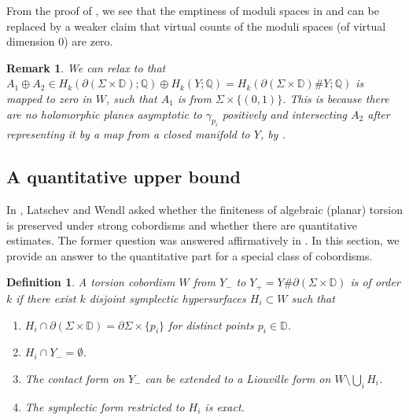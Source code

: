 \documentclass[11pt]{amsart}
\numberwithin{equation}{section}
\newtheorem{definition}[theorem]{\textbf{Definition}}
\newtheorem{remark}[theorem]{\textbf{Remark}}
\def\D{{\mathbb D}}
\def\Q{{\mathbb Q}}
\begin{document}
From the proof of , we see that the emptiness of moduli spaces in  and  can be replaced by a weaker claim that virtual counts of the moduli spaces (of virtual dimension $0$) are zero. 

\begin{remark}
    We can relax  to that $A_1\oplus A_2\in  H_k(\partial(\Sigma \times \D);\Q)\oplus H_k(Y;\Q) = H_k(\partial(\Sigma\times \D)\# Y;\Q)$ is mapped to zero in $W$, such that $A_1$ is from $\Sigma \times \{(0,1)\}$. This is because there are no holomorphic planes asymptotic to $\gamma_{p_i}$ positively and intersecting $A_2$ after representing it by a map from a closed manifold to $Y$, by  . 
\end{remark}


\subsection{A quantitative upper bound}
In \cite[Question 2]{LW}, Latschev and Wendl asked whether the finiteness of algebraic (planar) torsion is preserved under strong cobordisms and whether there are quantitative estimates. The former question was answered affirmatively in \cite{moreno2024rsft}. In this section, we provide an answer to the quantitative part for a special class of cobordisms. 
\begin{definition}\label{def:k_torsion_cobordism}
    A torsion cobordism $W$ from $Y_-$ to $Y_+=Y\#\partial(\Sigma\times \D)$ is of order $k$ if there exist $k$ disjoint symplectic hypersurfaces $H_i\subset W$ such that 
    \begin{enumerate}
        \item $H_i\cap \partial (\Sigma \times \D) = \partial \Sigma \times \{p_i\}$ for distinct points $p_i\in \D$. 
        \item $H_i\cap Y_- =\emptyset$.
        \item The contact form on $Y_-$ can be extended to a Liouville form on $W\setminus \bigcup_i H_i$.
        \item The symplectic form restricted to $H_i$ is exact.
    \end{enumerate}
\end{definition}
\end{document}
